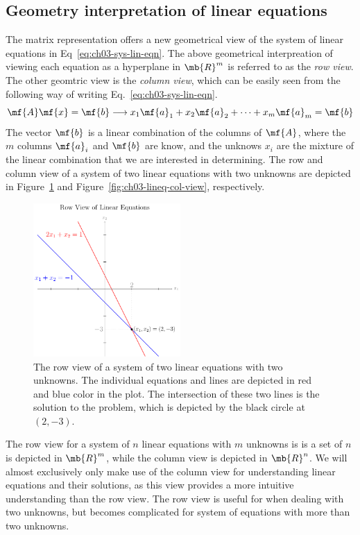 \subsection{Geometry interpretation of linear equations}
The matrix representation offers a new geometrical view of the system of linear equations in Eq~\ref{eq:ch03-sys-lin-eqn}. The above geometrical interpreation of viewing each equation as a hyperplane in $\mb{R}^m$ is referred to as the \textit{row view}. The other geomtric view is the \textit{column view}, which can be easily seen from the following way of writing Eq.~\ref{eq:ch03-sys-lin-eqn}.
\begin{equation}
    \mf{A}\mf{x} = \mf{b} \longrightarrow x_1\mf{a}_1 + x_2\mf{a}_2 + \cdots + x_m \mf{a}_m = \mf{b}
\end{equation}
The vector $\mf{b}$ is a linear combination of the columns of $\mf{A}$, where the $m$ columns $\mf{a}_i$ and $\mf{b}$ are know, and the unknows $x_i$ are the mixture of the linear combination that we are interested in determining. The row and column view of a system of two linear equations with two unknowns are depicted in Figure~\ref{fig:ch03-lineq-row-view} and Figure~\ref{fig:ch03-lineq-col-view}, respectively.

\begin{figure}[h]
    \centering
    \includegraphics[width=0.5\textwidth]{figure/chapter03/lineqrowview.pdf}
    \caption{The row view of a system of two linear equations with two unknowns. The individual equations and lines are depicted in red and blue color in the plot. The intersection of these two lines is the solution to the problem, which is depicted by the black circle at $(2, -3)$.}
    \label{fig:ch03-lineq-row-view}
\end{figure}
The row view for a system of $n$ linear equations with $m$ unknowns is is a set of $n$ is depicted in $\mb{R}^m$, while the column view is depicted in $\mb{R}^n$. We will almost exclusively only make use of the column view for understanding linear equations and their solutions, as this view provides a more intuitive understanding than the row view. The row view is useful for when dealing with two unknowns, but becomes complicated for system of equations with more than two unknowns. 

